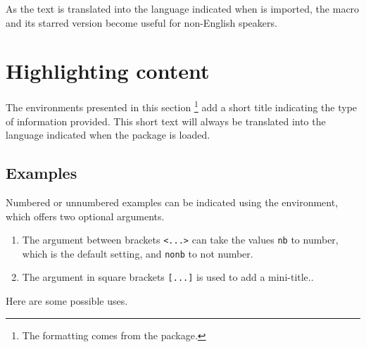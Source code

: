 \begin{tdocnote}
    As the text  is translated into the language indicated when  is imported, the macro  and its starred version become useful for non-English speakers.
\end{tdocnote}


\section{Highlighting content}

\begin{tdocnote}
    The environments presented in this section
    \footnote{
        The formatting comes from the  package.
    }
    add a short title indicating the type of information provided.
    This short text will always be translated into the language indicated when the  package is loaded.
\end{tdocnote}




\subsection{Examples}

Numbered or unnumbered examples can be indicated using the  environment, which offers two optional arguments.

\begin{enumerate}
    \item The  argument between brackets \verb#<...># can take the values \verb#nb# to number, which is the default setting, and \verb#nonb# to not number.

    \item The  argument in square brackets \verb#[...]# is used to add a mini-title..
\end{enumerate}


Here are some possible uses.







